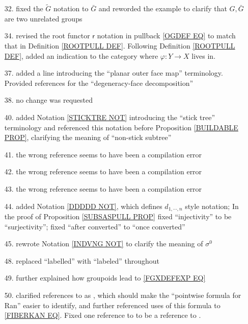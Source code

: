 \documentclass{article}
\begin{document}
\begin{itemize}
\item[32.] fixed the $\tilde{G}$ notation to $\bar{G}$ and reworded the example to clarify that $G,\bar{G}$ are two unrelated groups

\item[34.] revised the root functor $\mathsf{r}$ notation in pullback \eqref{OGDEF EQ} 
to match that in Definition \ref{ROOTPULL DEF}.
Following Definition \ref{ROOTPULL DEF},
added an indication to the category where 
$\varphi \colon Y \to X$ lives in.

\item[37.] added a line introducing the ``planar outer face map'' terminology. Provided references for the ``degeneracy-face decomposition'' 

\item[38.] no change was requested

\item[40.] added Notation \ref{STICKTRE NOT} introducing the ``stick tree'' terminology and referenced this notation before
Proposition \ref{BUILDABLE PROP},
clarifying the meaning of ``non-stick subtree''

\item[41.] the wrong reference seems to have been a compilation error

\item[42.] the wrong reference seems to have been a compilation error

\item[43.] the wrong reference seems to have been a compilation error

\item[44.] added Notation \ref{DDDDD NOT}, 
which defines $d_{1,\cdots,n}$ style notation; 
In the proof of Proposition \ref{SUBSASPULL PROP}
fixed ``injectivity'' to be ``surjectivity''; fixed ``after converted'' to ``once converted''

\item[45.] rewrote Notation \ref{INDVNG NOT}
to clarify the meaning of $\sigma^0$ 

\item[48.] replaced ``labelled'' with ``labeled'' throughout

\item[49.] further explained how groupoids lead to \eqref{FGXDEFEXP EQ}

\item[50.] clarified references to \cite[X.3.1]{McL} as \cite[X.3 Thm. 1]{McL}, which should make the ``pointwise formula for Ran'' easier to identify, and further referenced uses of this formula to \eqref{FIBERKAN EQ}.
Fixed one reference to \cite[X.3.1]{McL}
to be a reference to \cite[IX.3]{McL}.


\end{itemize}
\end{document}
